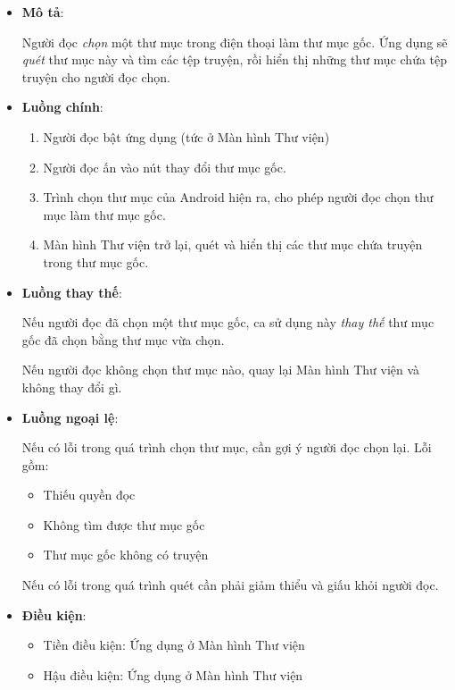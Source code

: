 \documentclass[../../thesis]{subfiles}
\begin{document}
\begin{itemize}
    \item
        \textbf{Mô tả}:

        Người đọc \emph{chọn} một thư mục trong điện thoại làm thư mục gốc. Ứng
        dụng sẽ \emph{quét} thư mục này và tìm các tệp truyện, rồi hiển thị
        những thư mục chứa tệp truyện cho người đọc chọn.
    \item
        \textbf{Luồng chính}:

        \begin{enumerate}
            \item
                Người đọc bật ứng dụng (tức ở Màn hình Thư viện)
            \item
                Người đọc ấn vào nút thay đổi thư mục gốc.
            \item
                Trình chọn thư mục của Android hiện ra, cho phép người đọc chọn
                thư mục làm thư mục gốc.
            \item
                Màn hình Thư viện trở lại, quét và hiển thị các thư mục chứa
                truyện trong thư mục gốc.
        \end{enumerate}
    \item
        \textbf{Luồng thay thế}:

        Nếu người đọc đã chọn một thư mục gốc, ca sử dụng này \emph{thay thế}
        thư mục gốc đã chọn bằng thư mục vừa chọn.

        Nếu người đọc không chọn thư mục nào, quay lại Màn hình Thư viện và
        không thay đổi gì.
    \item
        \textbf{Luồng ngoại lệ}:

        Nếu có lỗi trong quá trình chọn thư mục, cần gợi ý người đọc chọn lại.
        Lỗi gồm:

        \begin{itemize}
            \item
                Thiếu quyền đọc
            \item
                Không tìm được thư mục gốc
            \item
                Thư mục gốc không có truyện
        \end{itemize}

        Nếu có lỗi trong quá trình quét cần phải giảm thiểu và giấu khỏi người
        đọc.
    \item
        \textbf{Điều kiện}:

        \begin{itemize}
            \item
                Tiền điều kiện: Ứng dụng ở Màn hình Thư viện
            \item
                Hậu điều kiện: Ứng dụng ở Màn hình Thư viện


\end{itemize}
\end{itemize}
\end{document}
